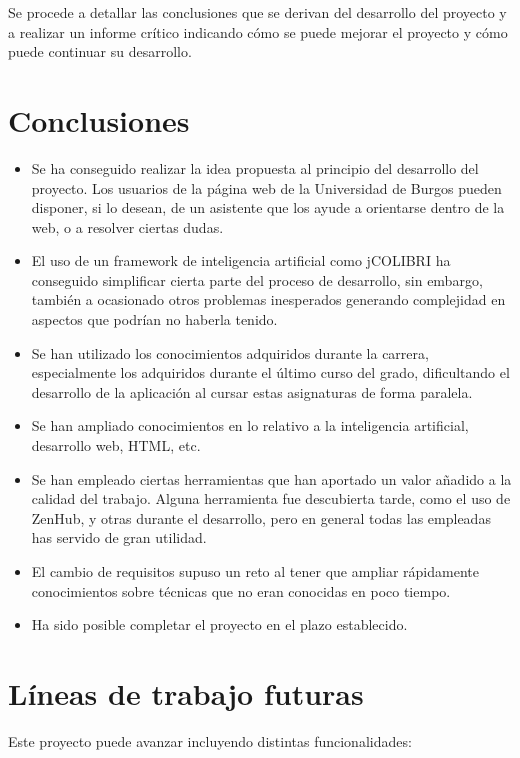 
Se procede a detallar las conclusiones que se derivan del desarrollo del proyecto y a realizar un informe crítico indicando cómo se puede mejorar el proyecto y cómo puede continuar su desarrollo.

\section{Conclusiones}

\begin{itemize}
\tightlist
\item
Se ha conseguido realizar la idea propuesta al principio del desarrollo del proyecto. Los usuarios de la página web de la Universidad de Burgos pueden disponer, si lo desean, de un asistente que los ayude a orientarse dentro de la web, o a resolver ciertas dudas.
\item
El uso de un framework de inteligencia artificial como jCOLIBRI ha conseguido simplificar cierta parte del proceso de desarrollo, sin embargo, también a ocasionado otros problemas inesperados generando complejidad en aspectos que podrían no haberla tenido.
\item
Se han utilizado los conocimientos adquiridos durante la carrera, especialmente los adquiridos durante el último curso del grado, dificultando el desarrollo de la aplicación al cursar estas asignaturas de forma paralela.
\item
Se han ampliado conocimientos en lo relativo a la inteligencia artificial, desarrollo web, HTML, etc.
\item
Se han empleado ciertas herramientas que han aportado un valor añadido a la calidad del trabajo. Alguna herramienta fue descubierta tarde, como el uso de ZenHub, y otras durante el desarrollo, pero en general todas las empleadas has servido de gran utilidad.
\item
El cambio de requisitos supuso un reto al tener que ampliar rápidamente conocimientos sobre técnicas que no eran conocidas en poco tiempo.
\item
Ha sido posible completar el proyecto en el plazo establecido.
\end{itemize}

\section{Líneas de trabajo futuras}

Este proyecto puede avanzar incluyendo distintas funcionalidades:

